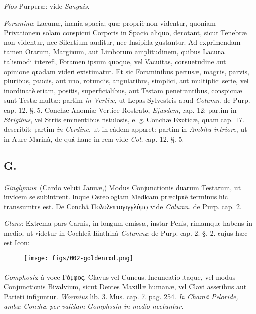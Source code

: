 \documentclass[a4paper, 11pt, oneside, polutonikogreek, german]{article}
\begin{document}
\emph{Flos} Purpuræ: vide \emph{Sanguis}.

\emph{Foramina}: Lacunæ, inania spacia; quæ propriè non videntur, quoniam Privationem solam conspicui Corporis in Spacio aliquo, denotant, sicut Tenebræ non videntur, nec Silentium auditur, nec Insipida gustantur. Ad exprimendam tamen Orarum, Marginum, aut Limborum amplitudinem, quibus Lacuna talismodi interefl, Foramen ipsum quoque, vel Vacuitas, consuetudine aut opinione quadam videri existimatur. Et sic Foraminibus pertusæ, magnis, parvis, pluribus, paucis, aut uno, rotundis, angularibus, simplici, aut multiplici serie, vel inordinatè etiam, positis, superficialibus, aut Testam penetrantibus, conspicuæ sunt Testæ multæ: partim \emph{in Vertice}, ut Lepas Sylvestris apud \emph{Column.} de Purp. cap. 12. §. 5. Conchæ Anomiæ Vertice Rostrato, \emph{Ejusdem}, cap. 12: partim in \emph{Strigibus}, vel Striis eminentibus fistulosis, e. g. Conchæ Exoticæ, quam cap. 17. describit: partim \emph{in Cardine}, ut in eâdem apparet: partim in \emph{Ambitu intriore}, ut in Aure Marinà, de quâ hanc in rem vide \emph{Col.} cap. 12. §. 5.

\subsection{G.}
\paragraph{}
\emph{Ginglymus}: (Cardo veluti Januæ,) Modus Conjunctionis duarum Testarum, ut invicem se subintrent. Inque Osteologiam Medicam præcipuè terminus hic transsumtus est. De Conchâ Πολυλεπτογιγγλύμῳ vide \emph{Column.} de Purp. cap. 2.

\emph{Glans}: Extrema pars Carnis, in longum emissæ, instar Penis, rimamque habens in medio, ut videtur in Cochleâ Iänthinâ \emph{Columnæ} de Purp. cap. 2. §. 2. cujus hæc est Icon:

\begin{figure}[H]
\centering
\texttt{[image: figs/002-goldenrod.png]}
\end{figure}
\paragraph{}
\emph{Gomphosis}: à voce Γόμφος, Clavus vel Cuneus. Incuneatio itaque, vel modus Conjunctionis Bivalvium, sicut Dentes Maxillæ humanæ, vel Clavi asseribus aut Parieti infiguntur. \emph{Wormius} lib. 3. Mus. cap. 7. pag. 254. \emph{In Chamâ Peloride, ambæ Conchæ per validam Gomphosin in medio nectuntur.}
\end{document}
